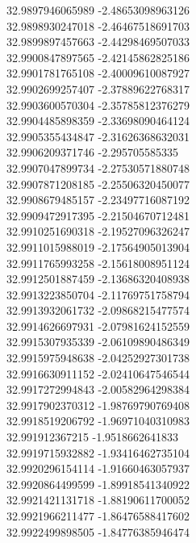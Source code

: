 {32.9897946065989	-2.48653098963126\\
32.9898930247018	-2.46467518691703\\
32.9899897457663	-2.44298469507033\\
32.9900847897565	-2.42145862825186\\
32.9901781765108	-2.40009610087927\\
32.9902699257407	-2.37889622768317\\
32.9903600570304	-2.35785812376279\\
32.9904485898359	-2.33698090464124\\
32.9905355434847	-2.31626368632031\\
32.9906209371746	-2.295705585335\\
32.9907047899734	-2.27530571880748\\
32.9907871208185	-2.25506320450077\\
32.9908679485157	-2.23497716087192\\
32.9909472917395	-2.21504670712481\\
32.9910251690318	-2.19527096326247\\
32.9911015988019	-2.17564905013904\\
32.9911765993258	-2.15618008951124\\
32.9912501887459	-2.13686320408938\\
32.9913223850704	-2.11769751758794\\
32.9913932061732	-2.09868215477574\\
32.9914626697931	-2.07981624152559\\
32.9915307935339	-2.06109890486349\\
32.9915975948638	-2.04252927301738\\
32.9916630911152	-2.02410647546544\\
32.9917272994843	-2.00582964298384\\
32.9917902370312	-1.98769790769408\\
32.9918519206792	-1.96971040310983\\
32.991912367215	-1.9518662641833\\
32.9919715932882	-1.93416462735104\\
32.9920296154114	-1.91660463057937\\
32.9920864499599	-1.89918541340922\\
32.9921421131718	-1.88190611700052\\
32.9921966211477	-1.86476588417602\\
32.9922499898505	-1.84776385946474\\
}
